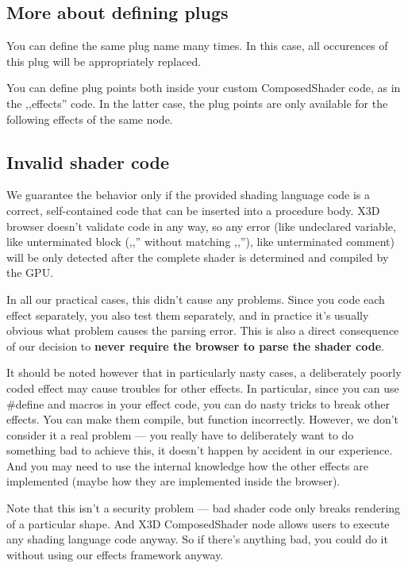 \documentclass{acmsiggraph}                     %
\begin{document}
\subsection{More about defining plugs}

You can define the same plug name many times. In this case,
all occurences of this plug will be appropriately replaced.

You can define plug points both inside your custom ComposedShader code,
as in the ,,effects'' code. In the latter case, the plug points
are only available for the following effects of the same node.

\subsection{Invalid shader code}

We guarantee the behavior only if the provided shading language code
is a correct, self-contained code that can be inserted into a procedure body.
X3D browser doesn't validate code in any way, so any error (like undeclared
variable, like unterminated block (,,{'' without matching ,,}''),
like unterminated comment) will be only detected after the complete shader
is determined and compiled by the GPU.

In all our practical cases, this didn't cause any problems.
Since you code each effect separately, you also test them separately,
and in practice it's usually obvious what problem causes the parsing error.
This is also a direct consequence of our decision to \textbf{never require
the browser to parse the shader code}.

It should be noted however that in particularly nasty cases,
a deliberately poorly coded effect may cause troubles for other effects.
In particular, since you can use \#define and macros in your effect code,
you can do nasty tricks to break other effects. You can make them compile,
but function incorrectly. However, we don't consider
it a real problem --- you really have to deliberately want to do something
bad to achieve this, it doesn't happen by accident in our experience.
And you may need to use the internal knowledge
how the other effects are implemented (maybe how they are implemented
inside the browser).

Note that this isn't a security problem --- bad shader code only breaks
rendering of a particular shape. And X3D ComposedShader node allows users
to execute any shading language code anyway. So if there's anything bad,
you could do it without using our effects framework anyway.

\end{document}
